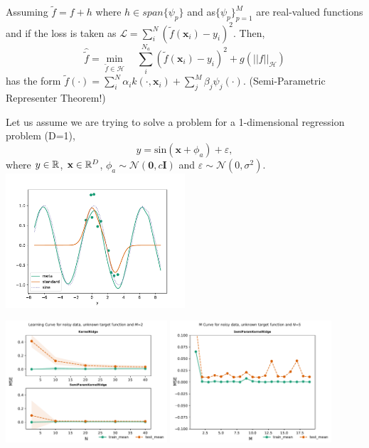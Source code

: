 \documentclass[a0paper,portrait]{baposter}
\begin{document}
\begin{poster}
{

Assuming $\tilde{f}= f + h$ where $h\in span\{\psi_p\}$ and as$\{\psi_p\}_{p=1}^M$ are real-valued functions and if the loss is taken as $\mathcal{L}=\sum_i^N(\tilde{f}(\mathbf{x}_i)-y_i)^2$. 
Then,
  \begin{equation}
  \hat{\tilde{f}} = \min_{\tilde{f}\in\mathcal{H}}\quad\sum_i^{N_a}(\tilde{f}(\mathbf{x}_i)-y_i)^2 + g(||f||_\mathcal{H})
  \end{equation}  
has the form $\tilde{f}(\cdot)=\sum^N_i\alpha_i k(\cdot,\mathbf{x}_i)+\sum_j^M\beta_j\psi_j(\cdot).$ (Semi-Parametric Representer Theorem!)


}

{

Let us assume we are trying to solve a problem  for a 1-dimensional regression problem (D=1),
\begin{equation}
  y = \text{sin}(\mathbf{x}+\phi_{a})+\varepsilon, 
\end{equation}
where $y\in\mathbb{R}$, $\mathbf{x}\in\mathbb{R}^D$, $\phi_{a} \sim \mathcal{N}(\mathbf{0}, c\mathbf{I})$ and $\varepsilon\sim\mathcal{N}(0, \sigma^2)$.
  \centering
  \includegraphics[width=0.5\textwidth]{figures/noise_2.pdf}

  \includegraphics[width=0.45\textwidth]{figures/learningcurve2.pdf}
  \includegraphics[width=0.45\textwidth]{figures/Mcurve5.pdf}

}
\end{poster}
\end{document}
